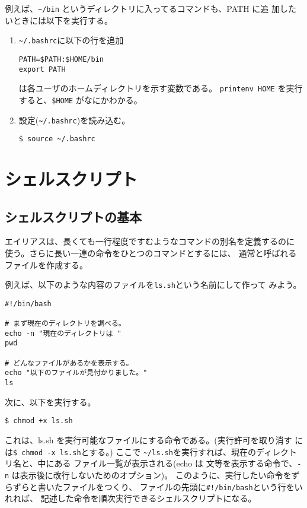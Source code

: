 \documentclass{jreport}
\begin{document}
例えば、\verb|~/bin| というディレクトリに入ってるコマンドも、PATH に追
加したいときには以下を実行する。
\begin{enumerate}
\item \verb|~/.bashrc|に以下の行を追加
  \begin{screen}
\begin{verbatim}
PATH=$PATH:$HOME/bin
export PATH
\end{verbatim}
  \end{screen}
  は各ユーザのホームディレクトリを示す変数である。
  \verb|printenv HOME| を実行すると、\verb|$HOME| がなにかわかる。
\item 設定(\verb|~/.bashrc|)を読み込む。
  \begin{screen}
\begin{verbatim}
$ source ~/.bashrc
\end{verbatim}
  \end{screen}
\end{enumerate}

\section{シェルスクリプト}

\subsection{シェルスクリプトの基本}

エイリアスは、長くても一行程度ですむようなコマンドの別名を定義するのに
使う。さらに長い一連の命令をひとつのコマンドとするには、
通常と呼ばれるファイルを作成する。

例えば、以下のような内容のファイルを\verb|ls.sh|という名前にして作って
みよう。
\begin{screen}
\begin{verbatim}
#!/bin/bash

# まず現在のディレクトリを調べる。
echo -n "現在のディレクトリは "
pwd

# どんなファイルがあるかを表示する。
echo "以下のファイルが見付かりました。"
ls
\end{verbatim}
\end{screen}
次に、以下を実行する。
\begin{screen}
\begin{verbatim}
$ chmod +x ls.sh
\end{verbatim}
\end{screen}
これは、ls.sh を実行可能なファイルにする命令である。(実行許可を取り消す
には\verb|$ chmod -x ls.sh|とする。)
ここで \verb|~/ls.sh|を実行すれば、現在のディレクトリ名と、中にある
ファイル一覧が表示される(echo は 文等を表示する命令で、\verb|-n|
は表示後に改行しないためのオプション)。
このように、実行したい命令をずらずらと書いたファイルをつくり、
ファイルの先頭に\verb|#!/bin/bash|という行をいれれば、
記述した命令を順次実行できるシェルスクリプトになる。
\end{document}
